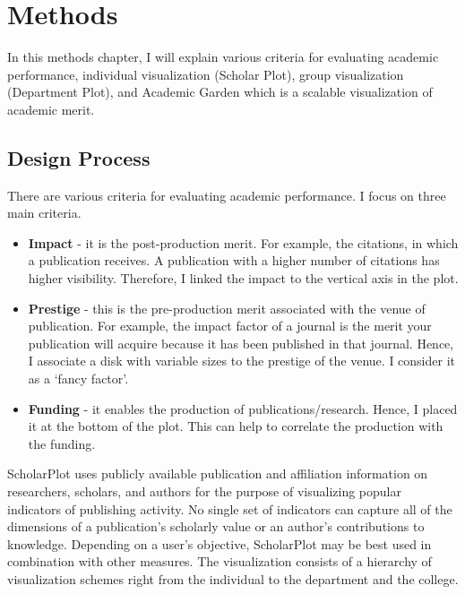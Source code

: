 \chapter{Methods}\label{chap:Methods }

In this methods chapter, I will explain various criteria for evaluating academic performance, individual visualization (Scholar Plot), group visualization (Department Plot), and Academic Garden which is a scalable visualization of academic merit.


\section{Design Process}
There are various criteria for evaluating academic performance. I focus on three main criteria.
\begin{itemize}
\item \textbf{Impact} - it is the post-production merit. For example, the citations, in which a publication receives. A publication with a higher number of citations has higher visibility. Therefore, I linked the impact to the vertical axis in the plot.
\item \textbf{Prestige} - this is the pre-production merit associated with the venue of publication. For example, the impact factor of a journal is the merit your publication will acquire because it has been published in that journal. Hence, I associate a disk with variable sizes to the prestige of the venue. I consider it as a `fancy factor'.
\item \textbf{Funding} - it enables the production of publications/research. Hence, I placed it at the bottom of the plot. This can help to correlate the production with the funding.
\end{itemize}

ScholarPlot uses publicly available publication and affiliation information on researchers, scholars, and authors for the purpose of visualizing popular indicators of publishing activity. No single set of indicators can capture all of the dimensions of a publication's scholarly value or an author's contributions to knowledge. Depending on a user's objective, ScholarPlot may be best used in combination with other measures. The visualization consists of a hierarchy of visualization schemes right from the individual to the department and the college.









